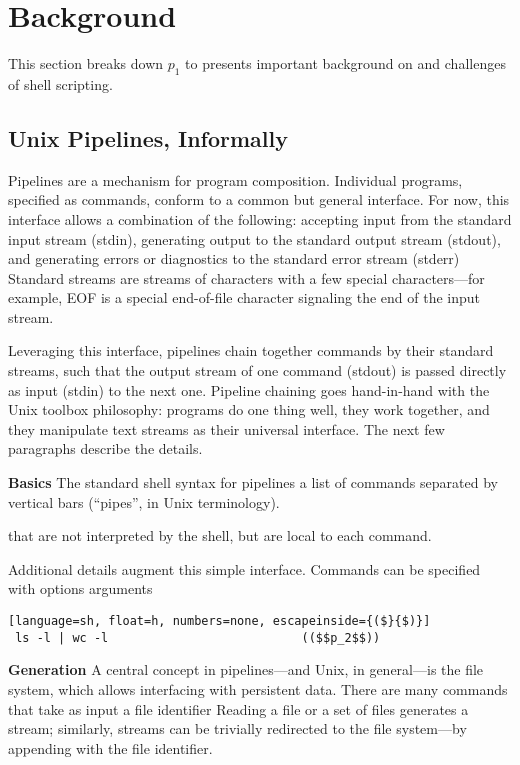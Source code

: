 \documentclass[sigplan,10pt,review,anonymous]{acmart}
\newcommand{\heading}[1]{\vspace{4pt}\noindent\textbf{#1}\enspace}
\begin{document}
\section{Background}
\label{bg}

This section breaks down $p_1$ to presents important background on and challenges
of shell scripting.

\subsection{Unix Pipelines, Informally}
\label{bg:pipelines}

Pipelines are a mechanism for program composition.
Individual programs, specified as commands, conform to a common but general interface. 
For now, this interface allows a combination of the following:
  accepting input from the standard input stream (stdin),
  generating output to the standard output stream (stdout), and
  generating errors or diagnostics to the standard error stream (stderr)
Standard streams are streams of characters with a few special characters---for example, EOF is a special end-of-file character signaling the end of the input stream.

Leveraging this interface, pipelines chain together commands by their standard streams, such that the output stream of one command (stdout) is passed directly as input (stdin) to the next one.
Pipeline chaining goes hand-in-hand with the Unix toolbox philosophy: 
  programs do one thing well, they work together, and they manipulate text streams as their universal interface.
The next few paragraphs describe the details.

\heading{Basics}
The standard shell syntax for pipelines a list of commands separated by vertical bars (``pipes'', in Unix terminology).

that are not interpreted by the shell, but are local to each command.

Additional details augment this simple interface.
Commands can be specified with options arguments


\begin{lstlisting}[language=sh, float=h, numbers=none, escapeinside={($}{$)}]
 ls -l | wc -l                           (($$p_2$$))
\end{lstlisting}

\heading{Generation}
A central concept in pipelines---and Unix, in general---is the file system, which allows interfacing with persistent data.
There are many commands that take as input a file identifier 
Reading a file or a set of files generates a stream; 
  similarly, streams can be trivially redirected to the file system---by appending with the file identifier.
\end{document}
